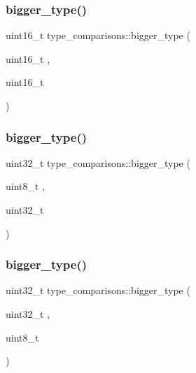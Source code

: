\hypertarget{namespacetype__comparisons_a36864af2f41734358e94eacff08459d6}{}\label{namespacetype__comparisons_a36864af2f41734358e94eacff08459d6} 
\subsubsection{\texorpdfstring{bigger\+\_\+type()}{bigger\_type()}\hspace{0.1cm}{\footnotesize\ttfamily [4/12]}}
{\footnotesize\ttfamily uint16\+\_\+t type\+\_\+comparisons\+::bigger\+\_\+type (\begin{DoxyParamCaption}\item[{uint16\+\_\+t}]{,  }\item[{uint16\+\_\+t}]{ }\end{DoxyParamCaption})}

\hypertarget{namespacetype__comparisons_a07cf30f82c4f24e069f597ba0f2da5f1}{}\label{namespacetype__comparisons_a07cf30f82c4f24e069f597ba0f2da5f1} 
\subsubsection{\texorpdfstring{bigger\+\_\+type()}{bigger\_type()}\hspace{0.1cm}{\footnotesize\ttfamily [5/12]}}
{\footnotesize\ttfamily uint32\+\_\+t type\+\_\+comparisons\+::bigger\+\_\+type (\begin{DoxyParamCaption}\item[{uint8\+\_\+t}]{,  }\item[{uint32\+\_\+t}]{ }\end{DoxyParamCaption})}

\hypertarget{namespacetype__comparisons_aa17f8395127e8110467de705e5c9424a}{}\label{namespacetype__comparisons_aa17f8395127e8110467de705e5c9424a} 
\subsubsection{\texorpdfstring{bigger\+\_\+type()}{bigger\_type()}\hspace{0.1cm}{\footnotesize\ttfamily [6/12]}}
{\footnotesize\ttfamily uint32\+\_\+t type\+\_\+comparisons\+::bigger\+\_\+type (\begin{DoxyParamCaption}\item[{uint32\+\_\+t}]{,  }\item[{uint8\+\_\+t}]{ }\end{DoxyParamCaption})}

